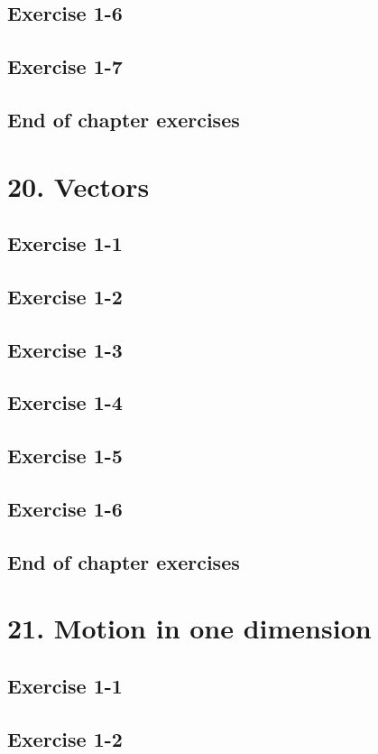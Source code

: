 \subsection{Exercise 1-6}
\subsection{Exercise 1-7}
\subsection{End of chapter exercises}
\section{20. Vectors}
\subsection{Exercise 1-1}
\subsection{Exercise 1-2}
\subsection{Exercise 1-3}
\subsection{Exercise 1-4}
\subsection{Exercise 1-5}
\subsection{Exercise 1-6}
\subsection{End of chapter exercises}
\section{21. Motion in one dimension}
\subsection{Exercise 1-1}
\subsection{Exercise 1-2}

